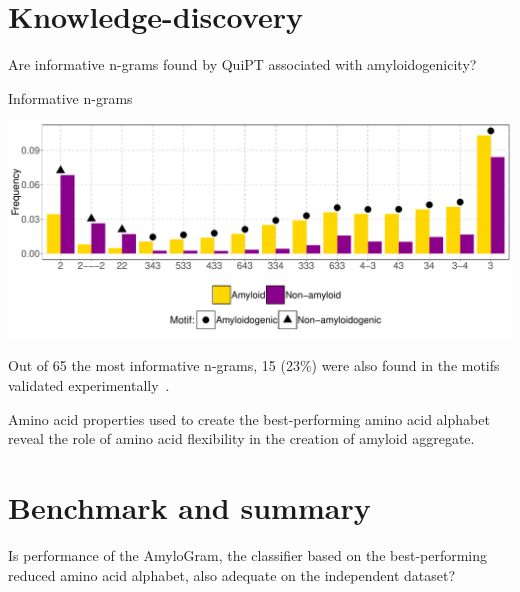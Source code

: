 \documentclass{beamer}\usepackage[]{graphicx}\usepackage[]{color}
\makeatletter
\def\maxwidth{ %
  \ifdim\Gin@nat@width>\linewidth
    \linewidth
  \else
    \Gin@nat@width
  \fi
}
\newenvironment{knitrout}{}{} %
\makeatother
\begin{document}
\section{Knowledge-discovery}

\begin{frame}{}
Are informative n-grams found by QuiPT associated with amyloidogenicity?
\end{frame}


\begin{frame}{Informative n-grams}
\begin{knitrout}
\color{fgcolor}

{\centering \includegraphics[width=\maxwidth]{figure/unnamed-chunk-7-1} 

}



\end{knitrout}

Out of 65 the most informative n-grams, 15 (23\%) were also found in the motifs validated experimentally~\citep{paz_sequence_2004}.
\end{frame}

\begin{frame}
Amino acid properties used to create the best-performing amino acid alphabet reveal the role of amino acid flexibility in the creation of amyloid aggregate.
\end{frame}

\section{Benchmark and summary}

\begin{frame}
Is performance of the AmyloGram, the classifier based on the best-performing reduced amino acid alphabet, also adequate on the independent dataset?
\end{frame}
\end{document}
